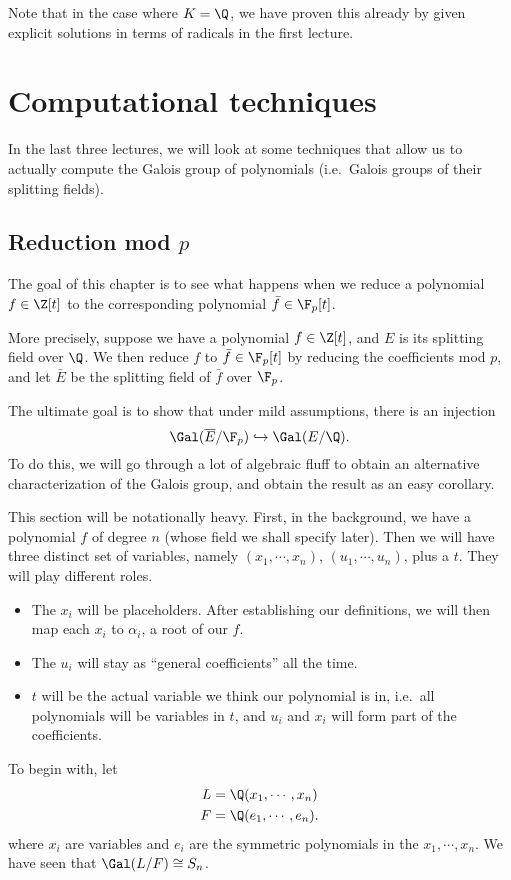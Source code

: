 \documentclass[a4paper]{article}
\begin{document}
Note that in the case where $K = \Q$, we have proven this already by given explicit solutions in terms of radicals in the first lecture.

\section{Computational techniques}
In the last three lectures, we will look at some techniques that allow us to actually compute the Galois group of polynomials (i.e.\ Galois groups of their splitting fields).

\subsection{Reduction mod \texorpdfstring{$p$}{p}}
The goal of this chapter is to see what happens when we reduce a polynomial $f \in \Z[t]$ to the corresponding polynomial $\bar{f} \in \F_p[t]$.

More precisely, suppose we have a polynomial $f \in \Z[t]$, and $E$ is its splitting field over $\Q$. We then reduce $f$ to $\bar{f} \in \F_p[t]$ by reducing the coefficients mod $p$, and let $\bar{E}$ be the splitting field of $\bar{f}$ over $\F_p$.

The ultimate goal is to show that under mild assumptions, there is an injection
\[
  \Gal(\overline{E}/\F_p) \hookrightarrow \Gal(E/\Q).
\]
To do this, we will go through a lot of algebraic fluff to obtain an alternative characterization of the Galois group, and obtain the result as an easy corollary.

This section will be notationally heavy. First, in the background, we have a polynomial $f$ of degree $n$ (whose field we shall specify later). Then we will have three distinct set of variables, namely $(x_1, \cdots, x_n)$, $(u_1, \cdots, u_n)$, plus a $t$. They will play different roles.
\begin{itemize}
  \item The $x_i$ will be placeholders. After establishing our definitions, we will then map each $x_i$ to $\alpha_i$, a root of our $f$.
  \item The $u_i$ will stay as ``general coefficients'' all the time.
  \item $t$ will be the actual variable we think our polynomial is in, i.e.\ all polynomials will be variables in $t$, and $u_i$ and $x_i$ will form part of the coefficients.
\end{itemize}

To begin with, let
\begin{align*}
  L &= \Q(x_1, \cdots, x_n)\\
  F &= \Q(e_1, \cdots, e_n).
\end{align*}
where $x_i$ are variables and $e_i$ are the symmetric polynomials in the $x_1, \cdots, x_n$. We have seen that $\Gal(L/F) \cong S_n$.
\end{document}

